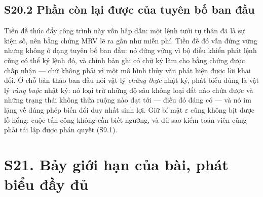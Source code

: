 \subsection*{S20.2 Phần còn lại được của tuyên bố ban đầu}

Tiền đề thúc đẩy công trình này vốn hấp dẫn: một lệnh tưới tự thân đã là sự kiện số, nên bằng
chứng MRV lẽ ra gần như miễn phí. Tiền đề đó vẫn đứng vững nhưng không ở dạng tuyên bố ban
đầu: nó đứng vững vì bộ điều khiển phát lệnh cũng có thể ký lệnh đó, và chính bản ghi có chữ
ký làm cho bằng chứng được chấp nhận --- chứ không phải vì một mô hình thủy văn phát hiện được
lời khai dối. Ở chỗ bản thảo ban đầu nói vật lý \emph{chứng thực} nhật ký, phát biểu đúng là
vật lý \emph{ràng buộc} nhật ký: nó loại trừ những độ sâu không loại đất nào chứa được và
những trạng thái không thửa ruộng nào đạt tới --- điều đó đáng có --- và nó im lặng về đúng
phép biến đổi duy nhất sinh lợi. Giữ bí mật $\varepsilon$ cũng không bịt được lỗ hổng: cuộc tấn
công không cần biết ngưỡng, và dù sao kiểm toán viên cũng phải tái lập được phán quyết
(S9.1).

\section*{S21. Bảy giới hạn của bài, phát biểu đầy đủ}

